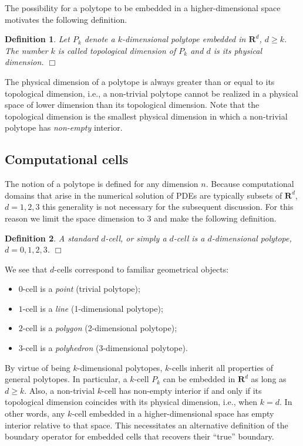 \documentclass[pdf,12pt,relaxed]{SANDreport}
\newtheorem{defin}{Definition}
\begin{document}
    The possibility for a polytope to be embedded in a higher-dimensional space motivates the following definition.
      
    \begin{defin}\label{def:dim}
    Let $P_k$ denote a $k$-dimensional polytope embedded in $\mathbf{R}^d$, $d\ge k$. The number $k$ is called topological dimension of $P_k$ and $d$ is its physical dimension. \hfill$\Box$
    \end{defin}
    
    The physical dimension of a polytope is always greater than or equal to its topological dimension, i.e., a non-trivial polytope cannot be realized in a physical space of lower dimension than its topological dimension.
    Note that the topological dimension is the smallest physical dimension in which a non-trivial polytope has \emph{non-empty} interior.   
    \subsection{Computational cells}
The notion of a polytope is defined for any dimension $n$. Because computational domains that arise in the numerical solution of PDEs are typically subsets of $\mathbf{R}^d$, $d=1,2,3$ this generality is not necessary for the subsequent discussion. For this reason we limit the space dimension to 3 and make the following definition. 
   
    \begin{defin}\label{def:cell}
    A standard $d$-cell, or simply a $d$-cell is a  $d$-dimensional polytope, $d=0,1,2,3$. \hfill$\Box$
    \end{defin}
    
    We see that $d$-cells correspond to familiar geometrical objects:
    \begin{itemize}
    \item $0$-cell is a \emph{point} (trivial polytope);
    \item $1$-cell is a \emph{line} (1-dimensional polytope);
    \item $2$-cell is  a \emph{polygon} (2-dimensional polytope);
    \item $3$-cell is a \emph{polyhedron} (3-dimensional polytope).
    \end{itemize}

     By virtue of being $k$-dimensional polytopes, $k$-cells inherit all properties of general polytopes. In particular, 
    a $k$-cell $P_k$ can be embedded in $\mathbf{R}^d$ as long as $d\ge k$. Also, a non-trivial $k$-cell has non-empty interior if and only if its topological dimension coincides with its physical dimension, i.e., when $k=d$. In other words, any $k$-cell embedded in a higher-dimensional space has empty interior relative to that space. This necessitates an alternative definition of the boundary operator for embedded cells that recovers their ``true'' boundary.
    
\end{document}
